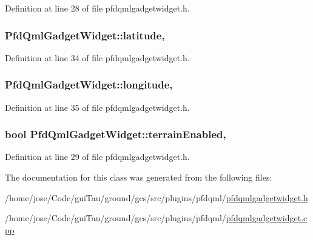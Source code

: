 Definition at line 28 of file pfdqmlgadgetwidget.\-h.

\hypertarget{class_pfd_qml_gadget_widget_a72c9413b6d8fcd5901d69e41ab87e77a}{
\subsubsection[{latitude}]{ Pfd\-Qml\-Gadget\-Widget\-::latitude\hspace{0.3cm}{\ttfamily [read]}, {\ttfamily [write]}}}\label{class_pfd_qml_gadget_widget_a72c9413b6d8fcd5901d69e41ab87e77a}


Definition at line 34 of file pfdqmlgadgetwidget.\-h.

\hypertarget{class_pfd_qml_gadget_widget_a37f3fe5251a59848388a2032bf09e5ce}{
\subsubsection[{longitude}]{ Pfd\-Qml\-Gadget\-Widget\-::longitude\hspace{0.3cm}{\ttfamily [read]}, {\ttfamily [write]}}}\label{class_pfd_qml_gadget_widget_a37f3fe5251a59848388a2032bf09e5ce}


Definition at line 35 of file pfdqmlgadgetwidget.\-h.

\hypertarget{class_pfd_qml_gadget_widget_afee0f7d6409cb17f5c6ea25b873630e0}{
\subsubsection[{terrain\-Enabled}]{\setlength{\rightskip}{0pt plus 5cm}bool Pfd\-Qml\-Gadget\-Widget\-::terrain\-Enabled\hspace{0.3cm}{\ttfamily [read]}, {\ttfamily [write]}}}\label{class_pfd_qml_gadget_widget_afee0f7d6409cb17f5c6ea25b873630e0}


Definition at line 29 of file pfdqmlgadgetwidget.\-h.



The documentation for this class was generated from the following files\-:\begin{DoxyCompactItemize}
\item 
/home/jose/\-Code/gui\-Tau/ground/gcs/src/plugins/pfdqml/\hyperlink{pfdqmlgadgetwidget_8h}{pfdqmlgadgetwidget.\-h}\item 
/home/jose/\-Code/gui\-Tau/ground/gcs/src/plugins/pfdqml/\hyperlink{pfdqmlgadgetwidget_8cpp}{pfdqmlgadgetwidget.\-cpp}\end{DoxyCompactItemize}
